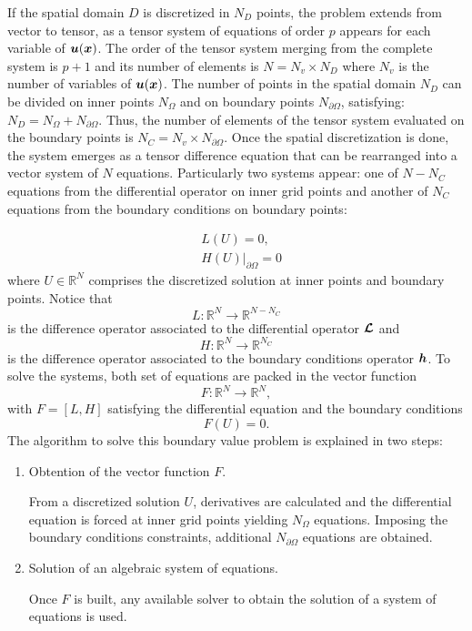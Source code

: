 If the spatial domain $D$ is discretized in $N_D$ points, the problem extends from vector to tensor, as a tensor system of equations of order $p$ appears for each variable of $\boldsymbol{u}(\boldsymbol{x})$. The order of the tensor system merging from the complete system is $p + 1$ and its number of elements is $N =   {N_v} \times N_D$ where $ N_v $ is the number of variables of $\boldsymbol{u}(\boldsymbol{x}) $. The number of points in the spatial domain $N_D$ can be divided on inner points $N_{\Omega}$ and on boundary points $N_{\partial\Omega}$, satisfying: $N_D = N_{\Omega} + N_{\partial\Omega} $. Thus, the number of elements of the tensor system evaluated on the boundary points is $N_C= {N_v} \times N_{\partial\Omega}$. Once the spatial discretization is done, the system emerges as a tensor difference equation that can be rearranged into a vector system of $N$ equations. Particularly two systems appear: one of $N-N_C$ equations from the differential operator on inner grid points and another of $N_C$ equations from the boundary conditions on boundary points:

\begin{align*}
  & {L}({U}) =0, \\
  & {H}({U})\big\rvert_{\partial \Omega}=0
\end{align*}
where $U \in \mathbb{ R}^{N}$ comprises the discretized solution at inner points and boundary points. 
Notice that 
$$
{L}: \mathbb{R}^{N} \rightarrow \mathbb{R}^{N-N_C} 
$$ 
is the difference operator associated to the differential operator 
$\boldsymbol{\mathcal{L}} $  and 
$${H}: \mathbb{ R}^{N} \rightarrow \mathbb{R}^{N_C}
$$ 
is the difference operator associated to the boundary conditions operator $ \boldsymbol{h} $. 
To solve the  systems, both set of equations are packed in the vector function 
$$
{F}: \mathbb{R}^{N} \rightarrow \mathbb{R}^{N}, 
$$
with $ F = [ L, H ]$ satisfying the differential equation and the boundary conditions
$$
F(U)=0. 
$$ 
The algorithm to solve this boundary value problem is explained in two steps:
       \begin{enumerate}
       	\item Obtention of the vector function $ F $.
       	
       	From a discretized solution $ U $, derivatives are calculated and the differential equation is forced at inner grid points yielding $ N_{\Omega} $ equations. Imposing the boundary conditions constraints, additional $ N_{\partial \Omega} $ equations are
       	obtained. 
       	
       	
       	\item Solution of an algebraic system of equations.  
       	
       	Once $ F $ is built, any available solver to obtain the solution of a system of equations is used. 
       \end{enumerate}
        

